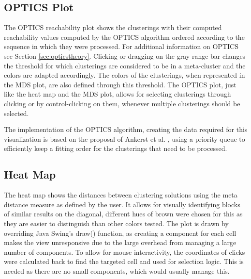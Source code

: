 \documentclass[
	a4paper,
	english,
	twoside,
	openright,               
	11pt                            
	]{report}
\begin{document}
\subsection{OPTICS Plot}
The OPTICS reachability plot shows the clusterings with their computed reachability values computed by the OPTICS algorithm ordered according to the sequence in which they were processed. For additional information on OPTICS see Section \ref{sec:opticstheory}. Clicking or dragging on the gray range bar changes the threshold for which clusterings are considered to be in a meta-cluster and the colors are adapted accordingly. The colors of the clusterings, when represented in the MDS plot, are also defined through this threshold. The OPTICS plot, just like the heat map and the MDS plot, allows for selecting clusterings through clicking or by control-clicking on them, whenever multiple clusterings should be selected.

The implementation of the OPTICS algorithm, creating the data required for this visualization is based on the proposal of Ankerst et al. \cite{10.1145/304181.304187}, using a priority queue to efficiently keep a fitting order for the clusterings that need to be processed.

\subsection{Heat Map}
The heat map shows the distances between clustering solutions using the meta distance measure as defined by the user. It allows for visually identifying blocks of similar results on the diagonal, different hues of brown were chosen for this as they are easier to distinguish than other colors tested. The plot is drawn by overriding Java Swing's \cite{javaswing} draw() function, as creating a component for each cell makes the view unresponsive due to the large overhead from managing a large number of components. To allow for mouse interactivity, the coordinates of clicks were calculated back to find the targeted cell and used for selection logic. This is needed as there are no small components, which would usually manage this.
\end{document}
